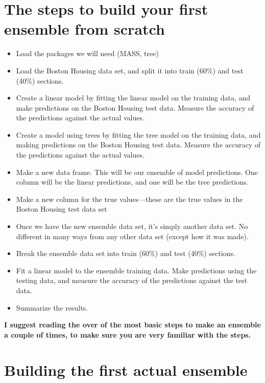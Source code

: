 \documentclass[
]{book}
\begin{document}
\section{The steps to build your first ensemble from scratch}\label{the-steps-to-build-your-first-ensemble-from-scratch}

\begin{itemize}
\item
  Load the packages we will need (MASS, tree)
\item
  Load the Boston Housing data set, and split it into train (60\%) and
  test (40\%) sections.
\item
  Create a linear model by fitting the linear model on the training
  data, and make predictions on the Boston Housing test data. Measure
  the accuracy of the predictions against the actual values.
\item
  Create a model using trees by fitting the tree model on the training
  data, and making predictions on the Boston Housing test data.
  Measure the accuracy of the predictions against the actual values.
\item
  Make a new data frame. This will be our ensemble of model
  predictions. One column will be the linear predictions, and one will
  be the tree predictions.
\item
  Make a new column for the true values---these are the true values in
  the Boston Housing test data set
\item
  Once we have the new ensemble data set, it's simply another data
  set. No different in many ways from any other data set (except how
  it was made).
\item
  Break the ensemble data set into train (60\%) and test (40\%)
  sections.
\item
  Fit a linear model to the ensemble training data. Make predictions
  using the testing data, and measure the accuracy of the predictions
  against the test data.
\item
  Summarize the results.
\end{itemize}

\textbf{I suggest reading the over of the most basic steps to make an ensemble
a couple of times, to make sure you are very familiar with the steps.}

\section{Building the first actual ensemble}\label{building-the-first-actual-ensemble}
\end{document}
